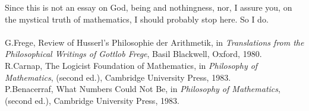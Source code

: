 Since this is not an essay on God, being and nothingness, nor, I assure you, on the mystical truth of mathematics, I should probably stop here. So I do. \\[4ex]

\nopagebreak \\[1ex]\nopagebreak
\noindent [1]  G.Frege, Review of Husserl's Philosophie der Arithmetik, in 
{\em Translations from the Philosophical Writings of Gottlob Frege}, Basil Blackwell, Oxford, 1980. \\[1ex]
\noindent [2]  R.Carnap, The Logicist Foundation of Mathematics, in {\em Philosophy of Mathematics}, (second ed.), Cambridge University Press, 1983. \\[1ex]
\noindent [3]  P.Benacerraf, What Numbers Could Not Be, in {\em Philosophy of Mathematics}, (second ed.), Cambridge University Press, 1983.


